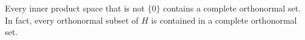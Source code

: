 Every inner product space that is not $\{0\}$ contains a complete orthonormal set. In fact, every orthonormal subset of $H$ is contained in a complete orthonormal set.